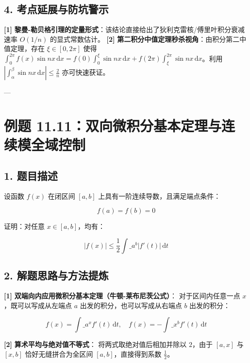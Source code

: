 \documentclass[11pt,a4paper,UTF8]{ctexart}
\begin{document}
\subsection{4. 考点延展与防坑警示}
\begin{solbox}[分步推导与答题规范]
\textbf{[1]}  \textbf{黎曼-勒贝格引理的定量形式}：该结论直接给出了狄利克雷核/傅里叶积分衰减速率 $O(1/n)$ 的显式常数估计。
\textbf{[2]}  \textbf{第二积分中值定理秒杀视角}：由积分第二中值定理，存在 $\xi \in [0, 2\pi]$ 使得 $\int_0^{2\pi} f(x)\sin nx\,\mathrm{d}x = f(0)\int_0^\xi \sin nx\,\mathrm{d}x + f(2\pi)\int_\xi^{2\pi} \sin nx\,\mathrm{d}x$。利用 $\left|\int_\alpha^\beta \sin nx\,\mathrm{d}x\right| \le \frac{2}{n}$ 亦可快速获证。
\end{solbox}

---


\section{例题 11.11：双向微积分基本定理与连续模全域控制}


\subsection{1. 题目描述}
设函数 $f(x)$ 在闭区间 $[a, b]$ 上具有一阶连续导数，且满足端点条件：

\begin{equation*}
f(a) = f(b) = 0
\end{equation*}

证明：对任意 $x \in [a, b]$，均有：

\begin{equation*}
|f(x)| \le \frac{1}{2}\int\_a^b |f'(t)|\,\mathrm{d}t
\end{equation*}



\subsection{2. 解题思路与方法提炼}
\begin{solbox}[分步推导与答题规范]
\textbf{[1]}  \textbf{双端向内应用微积分基本定理（牛顿-莱布尼茨公式）}：
对于区间内任意一点 $x$，既可以写成从左端点 $a$ 出发的积分，也可以写成从右端点 $b$ 出发的积分：

\begin{equation*}
f(x) = \int\_a^x f'(t)\,\mathrm{d}t,\quad f(x) = -\int\_x^b f'(t)\,\mathrm{d}t
\end{equation*}

\textbf{[2]}  \textbf{算术平均与绝对值不等式}：
将两式取绝对值后相加并除以 $2$，由于 $[a, x]$ 与 $[x, b]$ 恰好无缝拼合为全区间 $[a, b]$，直接得到系数 $\frac{1}{2}$。
\end{solbox}
\end{document}
